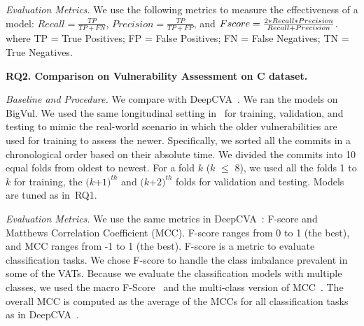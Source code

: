 \emph{Evaluation Metrics.} We use the following metrics to measure the
effectiveness of a model: $Recall = \frac{TP}{TP+FN}$, $Precision =
\frac{TP}{TP+FP}$, and $F\-score =
\frac{2*Recall*Precision}{Recall+Precision}$.
where TP = True Positives; FP = False Positives; FN = False Negatives; TN = True Negatives.


\noindent\textbf{RQ2. Comparison on Vulnerability Assessment on C dataset.}

{\em Baseline and Procedure.} We compare {\tool} with
DeepCVA~\cite{deepCVA-ase21}. We ran the models on BigVul. We used the
same longitudinal setting in~\cite{deepCVA-ase21,falessi2020need} for
training, validation, and testing to mimic the real-world scenario in
which the older vulnerabilities are used for training to assess the
newer. Specifically, we sorted all the commits in a chronological
order based on their absolute time. We divided the commits into 10
equal folds from oldest to newest. For a fold $k$ ($k$ $\le$ $8$), we used
all the folds 1 to $k$ for training, the $(k$+$1)^{th}$ and $(k$+$2)^{th}$
folds for validation and testing. Models are tuned as in~RQ1.



\emph{Evaluation Metrics.} We use the same metrics in
DeepCVA~\cite{deepCVA-ase21}: F-score and Matthews Correlation
Coefficient (MCC). F-score ranges from 0 to 1 (the best), and MCC
ranges from -1 to 1 (the best). F-score is a metric to evaluate
classification tasks. We chose F-score to handle the class imbalance
prevalent in some of the VATs. Because we evaluate the classification
models with multiple classes, we used the macro
F-Score~\cite{spanos2018multi} and the multi-class version of
MCC~\cite{gorodkin04}. The overall MCC is computed as the average of
the MCCs for all classification tasks as in DeepCVA~\cite{deepCVA-ase21}.

